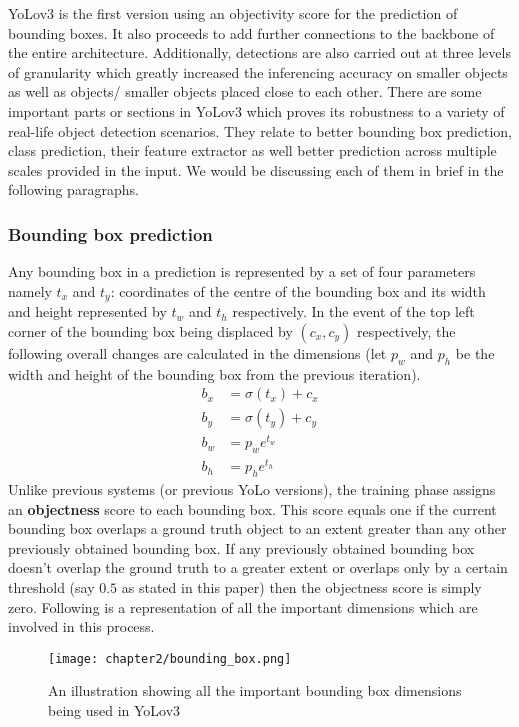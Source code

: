 YoLov3 is the first version using an objectivity score for the prediction of bounding boxes. It also proceeds to add further connections to the backbone of the entire architecture. Additionally, detections are also carried out at three levels of granularity which greatly increased the inferencing accuracy on smaller objects as well as objects/ smaller objects placed close to each other. There are some important parts or sections in YoLov3 which proves its robustness to a variety of real-life object detection scenarios. They relate to better bounding box prediction, class prediction, their feature extractor as well better prediction across multiple scales provided in the input. We would be discussing each of them in brief in the following paragraphs. \par

\subsubsection{Bounding box prediction}
Any bounding box in a prediction is represented by a set of four parameters namely $t_x$ and $t_y$: coordinates of the centre of the bounding box and its width and height represented by $t_w$ and $t_h$ respectively. In the event of the top left corner of the bounding box being displaced by $(c_x,c_y)$ respectively, the following overall changes are calculated in the dimensions (let $p_w$ and $p_h$ be the width and height of the bounding box from the previous iteration).
\begin{align*}
  b_x & =  \sigma(t_x) + c_x \\
  b_y & =  \sigma(t_y) + c_y \\
  b_w & =  {p_w}e^{t_w}      \\
  b_h & =  {p_h}e^{t_h}
\end{align*}
Unlike previous systems (or previous YoLo versions), the training phase assigns an \textbf{objectness} score to each bounding box. This score equals one if the current bounding box overlaps a ground truth object to an extent greater than any other previously obtained bounding box. If any previously obtained bounding box doesn’t overlap the ground truth to a greater extent or overlaps only by a certain threshold (say $0.5$ as stated in this paper) then the objectness score is simply zero. Following is a representation of all the important dimensions which are involved in this process.

\begin{figure}
  \centering
  \texttt{[image: chapter2/bounding\_box.png]}
  \caption{An illustration showing all the important bounding box dimensions being used in YoLov3}
  \label{fig:bbox}
\end{figure}

